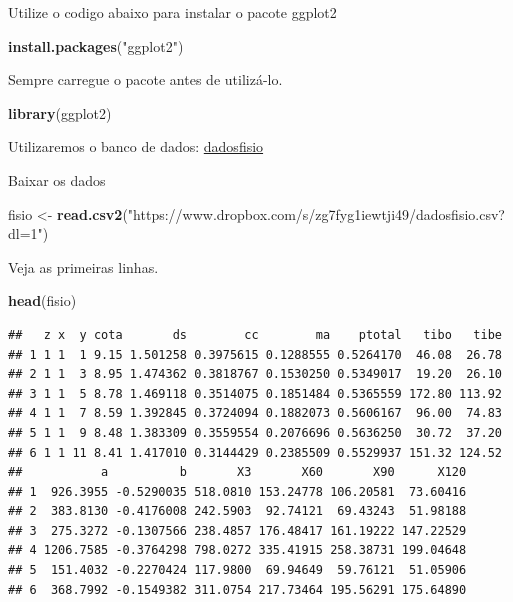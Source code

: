 \documentclass[]{book}
\newenvironment{Shaded}{\begin{snugshade}}{\end{snugshade}}
\newcommand{\KeywordTok}[1]{\textcolor[rgb]{0.13,0.29,0.53}{\textbf{#1}}}
\newcommand{\NormalTok}[1]{#1}
\newcommand{\StringTok}[1]{\textcolor[rgb]{0.31,0.60,0.02}{#1}}
\begin{document}
Utilize o codigo abaixo para instalar o pacote ggplot2

\begin{Shaded}
\begin{Highlighting}[]
\KeywordTok{install.packages}\NormalTok{(}\StringTok{"ggplot2"}\NormalTok{)}
\end{Highlighting}
\end{Shaded}

Sempre carregue o pacote antes de utilizá-lo.

\begin{Shaded}
\begin{Highlighting}[]
\KeywordTok{library}\NormalTok{(ggplot2)}
\end{Highlighting}
\end{Shaded}

Utilizaremos o banco de dados:
\href{https://www.dropbox.com/s/zg7fyg1iewtji49/dadosfisio.csv?dl=1}{dadosfisio}

Baixar os dados

\begin{Shaded}
\begin{Highlighting}[]
\NormalTok{fisio <-}\StringTok{ }\KeywordTok{read.csv2}\NormalTok{(}\StringTok{"https://www.dropbox.com/s/zg7fyg1iewtji49/dadosfisio.csv?dl=1"}\NormalTok{)}
\end{Highlighting}
\end{Shaded}

Veja as primeiras linhas.

\begin{Shaded}
\begin{Highlighting}[]
\KeywordTok{head}\NormalTok{(fisio)}
\end{Highlighting}
\end{Shaded}

\begin{verbatim}
##   z x  y cota       ds        cc        ma    ptotal   tibo   tibe
## 1 1 1  1 9.15 1.501258 0.3975615 0.1288555 0.5264170  46.08  26.78
## 2 1 1  3 8.95 1.474362 0.3818767 0.1530250 0.5349017  19.20  26.10
## 3 1 1  5 8.78 1.469118 0.3514075 0.1851484 0.5365559 172.80 113.92
## 4 1 1  7 8.59 1.392845 0.3724094 0.1882073 0.5606167  96.00  74.83
## 5 1 1  9 8.48 1.383309 0.3559554 0.2076696 0.5636250  30.72  37.20
## 6 1 1 11 8.41 1.417010 0.3144429 0.2385509 0.5529937 151.32 124.52
##           a          b       X3       X60       X90      X120
## 1  926.3955 -0.5290035 518.0810 153.24778 106.20581  73.60416
## 2  383.8130 -0.4176008 242.5903  92.74121  69.43243  51.98188
## 3  275.3272 -0.1307566 238.4857 176.48417 161.19222 147.22529
## 4 1206.7585 -0.3764298 798.0272 335.41915 258.38731 199.04648
## 5  151.4032 -0.2270424 117.9800  69.94649  59.76121  51.05906
## 6  368.7992 -0.1549382 311.0754 217.73464 195.56291 175.64890
\end{verbatim}
\end{document}
